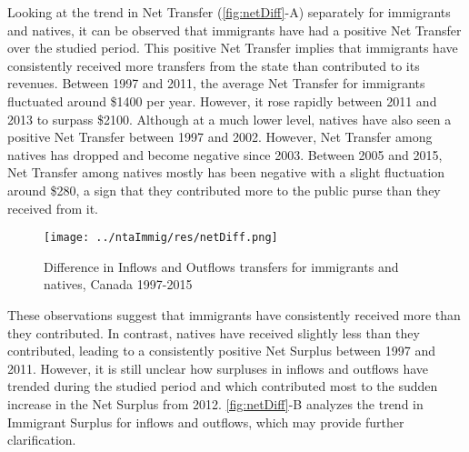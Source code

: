 \vspace{0.7em}\par
Looking at the trend in Net Transfer (\autoref{fig:netDiff}-A) separately for immigrants and natives, it can be observed that immigrants have had a positive Net Transfer over the studied period.
This positive Net Transfer implies that immigrants have consistently received more transfers from the state than contributed to its revenues.
Between 1997 and 2011, the average Net Transfer for immigrants fluctuated around \$\num{1400} per year.
However, it rose rapidly between 2011 and 2013 to surpass \$\num{2100}.
Although at a much lower level, natives have also seen a positive Net Transfer between 1997 and 2002.
However, Net Transfer among natives has dropped and become negative since 2003.
Between 2005 and 2015, Net Transfer among natives mostly has been negative with a slight fluctuation around \$280, a sign that they contributed more to the public purse than they received from it.

\begin{figure}[H]%
  \caption{Difference in Inflows and Outflows transfers for immigrants and natives, Canada 1997-2015}
  \texttt{[image: ../ntaImmig/res/netDiff.png]}%
  \label{fig:netDiff}%
\end{figure}%

\vspace{0.7em}\par
These observations suggest that immigrants have consistently received more than they contributed.
In contrast, natives have received slightly less than they contributed, leading to a consistently positive Net Surplus between 1997 and 2011.
However, it is still unclear how surpluses in inflows and outflows have trended during the studied period and which contributed most to the sudden increase in the Net Surplus from 2012.
\autoref{fig:netDiff}-B analyzes the trend in Immigrant Surplus for inflows and outflows, which may provide further clarification.

